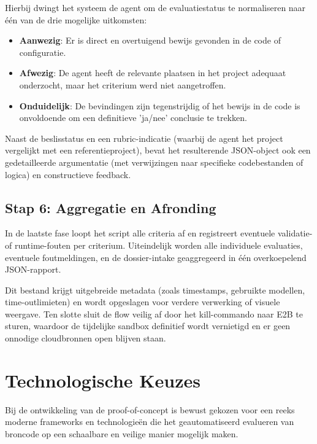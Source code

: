Hierbij dwingt het systeem de agent om de evaluatiestatus te normaliseren naar één van de drie mogelijke uitkomsten:
\begin{itemize}
    \item \textbf{Aanwezig}: Er is direct en overtuigend bewijs gevonden in de code of configuratie.
    \item \textbf{Afwezig}: De agent heeft de relevante plaatsen in het project adequaat onderzocht, maar het criterium werd niet aangetroffen.
    \item \textbf{Onduidelijk}: De bevindingen zijn tegenstrijdig of het bewijs in de code is onvoldoende om een definitieve 'ja/nee' conclusie te trekken.
\end{itemize}

Naast de beslisstatus en een rubric-indicatie (waarbij de agent het project vergelijkt met een referentieproject), bevat het resulterende JSON-object ook een gedetailleerde argumentatie (met verwijzingen naar specifieke codebestanden of logica) en constructieve feedback.

\subsection{Stap 6: Aggregatie en Afronding}

In de laatste fase loopt het script alle criteria af en registreert eventuele validatie- of runtime-fouten per criterium. Uiteindelijk worden alle individuele evaluaties, eventuele foutmeldingen, en de dossier-intake geaggregeerd in één overkoepelend JSON-rapport.

\vspace{1em}

Dit bestand krijgt uitgebreide metadata (zoals timestamps, gebruikte modellen, time-outlimieten) en wordt opgeslagen voor verdere verwerking of visuele weergave. Ten slotte sluit de flow veilig af door het kill-commando naar E2B te sturen, waardoor de tijdelijke sandbox definitief wordt vernietigd en er geen onnodige cloudbronnen open blijven staan.

\section{Technologische Keuzes}

Bij de ontwikkeling van de proof-of-concept is bewust gekozen voor een reeks moderne frameworks en technologieën die het geautomatiseerd evalueren van broncode op een schaalbare en veilige manier mogelijk maken.

